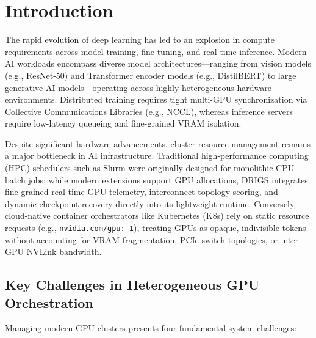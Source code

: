 \section{Introduction}
\label{sec:introduction}

The rapid evolution of deep learning has led to an explosion in compute requirements across model training, fine-tuning, and real-time inference. Modern AI workloads encompass diverse model architectures—ranging from vision models (e.g., ResNet-50) and Transformer encoder models (e.g., DistilBERT) to large generative AI models—operating across highly heterogeneous hardware environments. Distributed training requires tight multi-GPU synchronization via Collective Communications Libraries (e.g., NCCL), whereas inference servers require low-latency queueing and fine-grained VRAM isolation.

Despite significant hardware advancements, cluster resource management remains a major bottleneck in AI infrastructure. Traditional high-performance computing (HPC) schedulers such as Slurm were originally designed for monolithic CPU batch jobs; while modern extensions support GPU allocations, DRIGS integrates fine-grained real-time GPU telemetry, interconnect topology scoring, and dynamic checkpoint recovery directly into its lightweight runtime. Conversely, cloud-native container orchestrators like Kubernetes (K8s) rely on static resource requests (e.g., \texttt{nvidia.com/gpu: 1}), treating GPUs as opaque, indivisible tokens without accounting for VRAM fragmentation, PCIe switch topologies, or inter-GPU NVLink bandwidth.

\subsection{Key Challenges in Heterogeneous GPU Orchestration}
Managing modern GPU clusters presents four fundamental system challenges:

